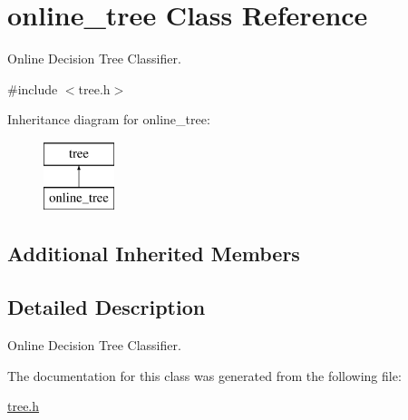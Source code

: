 \hypertarget{classonline__tree}{\section{online\+\_\+tree Class Reference}
\label{classonline__tree}
}


Online Decision Tree Classifier.  




{\ttfamily \#include $<$tree.\+h$>$}

Inheritance diagram for online\+\_\+tree\+:\begin{figure}[H]
\begin{center}
\leavevmode
\includegraphics[height=2.000000cm]{classonline__tree}
\end{center}
\end{figure}
\subsection*{Additional Inherited Members}


\subsection{Detailed Description}
Online Decision Tree Classifier. 

The documentation for this class was generated from the following file\+:\begin{DoxyCompactItemize}
\item 
\hyperlink{tree_8h}{tree.\+h}\end{DoxyCompactItemize}
